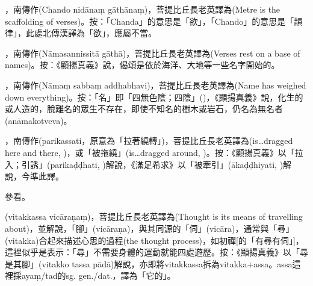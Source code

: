 \startitemgroup[noteitems]
\item{}，南傳作(Chando nidānaṃ gāthānaṃ)，菩提比丘長老英譯為(Metre is the scaffolding of verses)。按：「Chanda」的意思是「欲」，「Chando」的意思是「韻律」，此處北傳漢譯為「欲」，應屬不當。
\stopitemgroup

\startitemgroup[noteitems]
\item{}，南傳作(Nāmasannissitā gāthā)，菩提比丘長老英譯為(Verses rest on a base of names)。按：《顯揚真義》說，偈頌是依於海洋、大地等一些名字開始的。
\stopitemgroup

\startitemgroup[noteitems]
\item{}，南傳作(Nāmaṃ sabbaṃ addhabhavi)，菩提比丘長老英譯為(Name has weighed down everything)。按：「名」即「四無色陰；四陰」()，《顯揚真義》說，化生的或人造的，脫離名的眾生不存在，即使不知名的樹木或岩石，仍名為無名者(anāmakotveva)。
\stopitemgroup

\startitemgroup[noteitems]
\item{}，南傳作(parikassati，原意為「拉著繞轉」)，菩提比丘長老英譯為(is…dragged here and there, )，或「被拖繞」(is…dragged around, )。按：《顯揚真義》以「拉入；引誘」(parikaḍḍhati, )解說，《滿足希求》以「被牽引」(ākaḍḍhiyati, )解說，今準此譯。
\stopitemgroup

\startitemgroup[noteitems]
\item{}參看。
\stopitemgroup

\startitemgroup[noteitems]
\item{}(vitakkassa vicāraṇaṃ)，菩提比丘長老英譯為(Thought is its means of travelling about)，並解說，「腳」(vicāraṇa)，與其同源的「伺」(vicāra)，通常與「尋」(vitakka)合起來描述心思的過程(the thought process)，如初禪[的「有尋有伺」]，這裡似乎是表示：「尋」不需要身體的運動就能四處遊歷。按：《顯揚真義》以「尋是其腳」(vitakko tassa pādā)解說，亦即將vitakkassa拆為vitakka+assa。assa這裡採ayaṃ/tad的sg. gen./dat.，譯為「它的」。
\stopitemgroup

